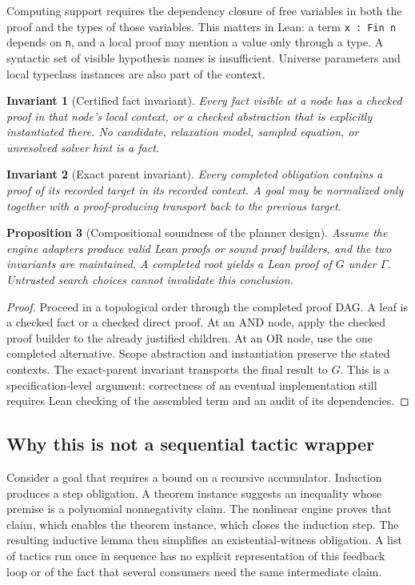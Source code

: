 \documentclass[11pt,a4paper]{article}
\newcommand{\code}[1]{\texttt{#1}}
\newtheorem{proposition}{Proposition}[section]
\newtheorem{invariant}[proposition]{Invariant}
\begin{document}
Computing support requires the dependency closure of free variables in both
the proof and the types of those variables. This matters in Lean: a term
\code{x : Fin n} depends on \code{n}, and a local proof may mention a value only
through a type. A syntactic set of visible hypothesis names is insufficient.
Universe parameters and local typeclass instances are also part of the context.

\begin{invariant}[Certified fact invariant]
Every fact visible at a node has a checked proof in that node's local context,
or a checked abstraction that is explicitly instantiated there. No candidate,
relaxation model, sampled equation, or unresolved solver hint is a fact.
\end{invariant}

\begin{invariant}[Exact parent invariant]
Every completed obligation contains a proof of its recorded target in its
recorded context. A goal may be normalized only together with a proof-producing
transport back to the previous target.
\end{invariant}

\begin{proposition}[Compositional soundness of the planner design]
Assume the engine adapters produce valid Lean proofs or sound proof builders,
and the two invariants are maintained. A completed root yields a Lean proof of
$G$ under $\Gamma$. Untrusted search choices cannot invalidate this conclusion.
\end{proposition}
\begin{proof}
Proceed in a topological order through the completed proof DAG. A leaf is a
checked fact or a checked direct proof. At an AND node, apply the checked proof
builder to the already justified children. At an OR node, use the one completed
alternative. Scope abstraction and instantiation preserve the stated contexts.
The exact-parent invariant transports the final result to $G$. This is a
specification-level argument: correctness of an eventual implementation still
requires Lean checking of the assembled term and an audit of its dependencies.
\end{proof}

\subsection{Why this is not a sequential tactic wrapper}
Consider a goal that requires a bound on a recursive accumulator. Induction
produces a step obligation. A theorem instance suggests an inequality whose
premise is a polynomial nonnegativity claim. The nonlinear engine proves that
claim, which enables the theorem instance, which closes the induction step.
The resulting inductive lemma then simplifies an existential-witness obligation.
A list of tactics run once in sequence has no explicit representation of this
feedback loop or of the fact that several consumers need the same intermediate
claim.
\end{document}
